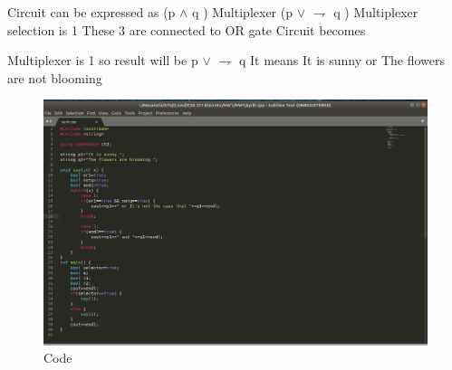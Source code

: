 \documentclass{article}
\begin{document}
\newline\newline\newline

\begin{itemize}
    
\end{itemize}

    Circuit can be expressed as (p $\wedge$ q ) Multiplexer  (p $\vee$ $\rightharpoondown$ q ) \newline
    Multiplexer selection is 1\newline
    These 3 are connected to OR gate\newline
    Circuit becomes \newline
    
    Multiplexer is 1 so result will be p $\vee$ $\rightharpoondown$ q \newline
    It means It is sunny or The flowers are not blooming
    \newline
    \newline

\begin{figure}[htp]
	\centering
	\includegraphics[scale=0.5]{code.png}
	\caption{Code}
	\label{fig: circuit}
	
\end{figure}





   
   
    



   
\end{document}
